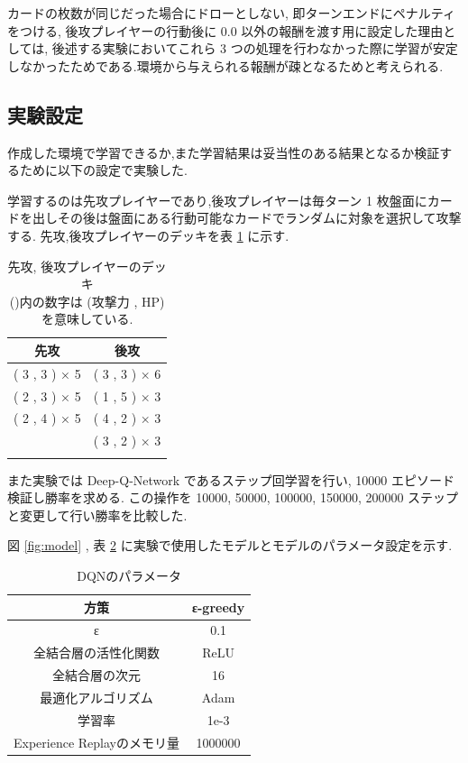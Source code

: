 \documentclass{jarticle}     %
\begin{document}
カードの枚数が同じだった場合にドローとしない, 即ターンエンドにペナルティをつける, 後攻プレイヤーの行動後に 0.0 以外の報酬を渡す用に設定した理由としては, 後述する実験においてこれら 3 つの処理を行わなかった際に学習が安定しなかったためである.環境から与えられる報酬が疎となるためと考えられる.

\subsection{実験設定}
作成した環境で学習できるか,また学習結果は妥当性のある結果となるか検証するために以下の設定で実験した.\par
学習するのは先攻プレイヤーであり,後攻プレイヤーは毎ターン 1 枚盤面にカードを出しその後は盤面にある行動可能なカードでランダムに対象を選択して攻撃する.
先攻,後攻プレイヤーのデッキを表 \ref{table:deck} に示す.

\begin{table}[h]
  \centering
  \caption{先攻, 後攻プレイヤーのデッキ\\
  ()内の数字は (攻撃力 , HP) を意味している.}
  \begin{tabular}{ll}
  \multicolumn{1}{c}{先攻} & \multicolumn{1}{c}{後攻} \\
  \hline
  ( 3 , 3 ) × 5          & ( 3 , 3 )  × 6         \\
  ( 2 , 3 ) × 5          & ( 1 , 5 ) × 3          \\
  ( 2 , 4 ) × 5          & ( 4 , 2 ) × 3          \\
                         & ( 3 , 2 ) × 3         \\
  \hline
  \label{table:deck}
  \end{tabular}
\end{table}

また実験では Deep-Q-Network であるステップ回学習を行い, 10000 エピソード検証し勝率を求める.
この操作を 10000, 50000, 100000, 150000, 200000 ステップと変更して行い勝率を比較した.

図 \ref{fig:model} , 表 \ref{table:param} に実験で使用したモデルとモデルのパラメータ設定を示す.

\begin{table}[h]
  \centering
  \caption{DQNのパラメータ\cite{パラメータ}}
  \label{table:param}
  \begin{tabular}{|c||c|}
  \hline
  方策                 & ε-greedy \\ \hline
  ε                      & 0.1      \\ \hline
  全結合層の活性化関数             & ReLU     \\ \hline
  全結合層の次元                & 16       \\ \hline
  最適化アルゴリズム              & Adam     \\ \hline
  学習率                    & 1e-3     \\ \hline
  Experience Replayのメモリ量 & 1000000  \\ \hline
  \end{tabular}
  \end{table}
\end{document}
